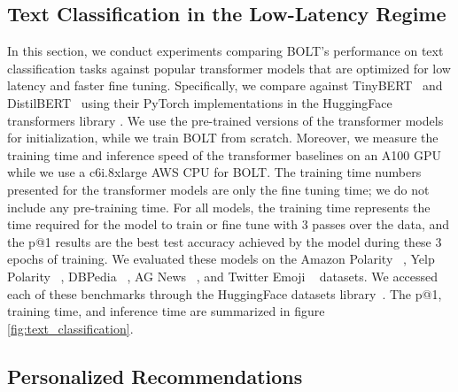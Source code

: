 \documentclass[sigconf]{acmart}
\begin{document}
\subsection{Text Classification in the Low-Latency Regime}

In this section, we conduct experiments comparing BOLT's performance on text classification tasks against popular transformer models \cite{vaswani2017attention} that are optimized for low latency and faster fine tuning. Specifically, we compare against TinyBERT~\cite{turc2019well} and DistilBERT~\cite{sanh2019distilbert} using their PyTorch implementations in the HuggingFace transformers library \cite{wolf2019huggingface}. We use the pre-trained versions of the transformer models for initialization, while we train BOLT from scratch. Moreover, we measure the training time and inference speed of the transformer baselines on an A100 GPU while we use a c6i.8xlarge AWS CPU for BOLT. The training time numbers presented for the transformer models are only the fine tuning time; we do not include any pre-training time. For all models, the training time represents the time required for the model to train or fine tune with 3 passes over the data, and the p@1 results are the best test accuracy achieved by the model during these 3 epochs of training. We evaluated these models on the Amazon Polarity ~\cite{zhangCharacterlevelConvolutionalNetworks2015, mcauley2013hidden}, Yelp Polarity ~\cite{zhangCharacterlevelConvolutionalNetworks2015}, DBPedia ~\cite{zhangCharacterlevelConvolutionalNetworks2015, lehmann2015dbpedia}, AG News ~\cite{zhangCharacterlevelConvolutionalNetworks2015}, and Twitter Emoji ~\cite{barbieri2020tweeteval} datasets. We accessed each of these benchmarks through the HuggingFace datasets library~\cite{lhoest2021datasets}. The p@1, training time, and inference time are summarized in figure \ref{fig:text_classification}.


















 



\subsection{Personalized Recommendations}
\end{document}
